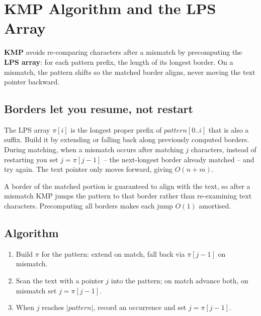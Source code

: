\section{KMP Algorithm and the LPS Array}
\label{sec:str-kmp-lps}


\begin{patternbox}
\textbf{KMP} avoids re-comparing characters after a mismatch by precomputing
the \textbf{LPS array}: for each pattern prefix, the length of its longest
border. On a mismatch, the pattern shifts so the matched border aligns,
never moving the text pointer backward.
\end{patternbox}

\subsection*{Borders let you resume, not restart}

The LPS array $\pi[i]$ is the longest proper prefix of
$\textit{pattern}[0..i]$ that is also a suffix. Build it by extending or
falling back along previously computed borders. During matching, when a
mismatch occurs after matching $j$ characters, instead of restarting you set
$j=\pi[j-1]$ -- the next-longest border already matched -- and try again. The
text pointer only moves forward, giving $O(n+m)$.

\begin{ideabox}
A border of the matched portion is guaranteed to align with the text, so
after a mismatch KMP jumps the pattern to that border rather than
re-examining text characters. Precomputing all borders makes each jump
$O(1)$ amortised.
\end{ideabox}

\subsection*{Algorithm}

\begin{enumerate}
  \item Build $\pi$ for the pattern: extend on match, fall back via
        $\pi[j-1]$ on mismatch.
  \item Scan the text with a pointer $j$ into the pattern; on match advance
        both, on mismatch set $j=\pi[j-1]$.
  \item When $j$ reaches $|\textit{pattern}|$, record an occurrence and set
        $j=\pi[j-1]$.
\end{enumerate}


